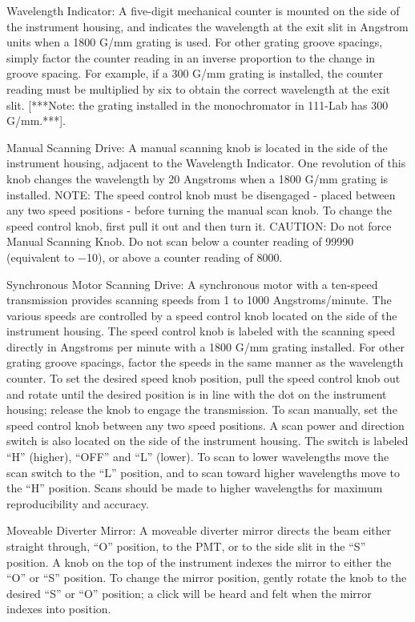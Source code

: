 \documentclass{../lab}
\begin{document}
Wavelength Indicator: A five-digit mechanical counter is mounted on the side of the instrument housing, and indicates the wavelength at the exit slit in Angstrom units when a 1800 G/mm grating is used. For other grating groove spacings, simply factor the counter reading in an inverse proportion to the change in groove spacing. For example, if a 300 G/mm grating is installed, the counter reading must be multiplied by six to obtain the correct wavelength at the exit slit. [***Note: the grating installed in the monochromator in 111-Lab has 300 G/mm.***].

Manual Scanning Drive: A manual scanning knob is located in the side of the instrument housing, adjacent to the Wavelength Indicator. One revolution of this knob changes the wavelength by 20 Angstroms when a 1800 G/mm grating is installed. NOTE: The speed control knob must be disengaged - placed between any two speed positions - before turning the manual scan knob. To change the speed control knob, first pull it out and then turn it. CAUTION: Do not force Manual Scanning Knob. Do not scan below a counter reading of 99990 (equivalent to $-$10), or above a counter reading of 8000.

Synchronous Motor Scanning Drive: A synchronous motor with a ten-speed transmission provides scanning speeds from 1 to 1000 Angstroms/minute. The various speeds are controlled by a speed control knob located on the side of the instrument housing. The speed control knob is labeled with the scanning speed directly in Angstroms per minute with a 1800 G/mm grating installed. For other grating groove spacings, factor the speeds in the same manner as the wavelength counter. To set the desired speed knob position, pull the speed control knob out and rotate until the desired position is in line with the dot on the instrument housing; release the knob to engage the transmission. To scan manually, set the speed control knob between any two speed positions. A scan power and direction switch is also located on the side of the instrument housing. The switch is labeled ``H'' (higher), ``OFF'' and ``L'' (lower). To scan to lower wavelengths move the scan switch to the ``L'' position, and to scan toward higher wavelengths move to the ``H'' position. Scans should be made to higher wavelengths for maximum reproducibility and accuracy.

Moveable Diverter Mirror: A moveable diverter mirror directs the beam either straight through, ``O'' position, to the PMT, or to the side slit in the ``S'' position. A knob on the top of the instrument indexes the mirror to either the ``O'' or ``S'' position. To change the mirror position, gently rotate the knob to the desired ``S'' or ``O'' position; a click will be heard and felt when the mirror indexes into position.
\end{document}
